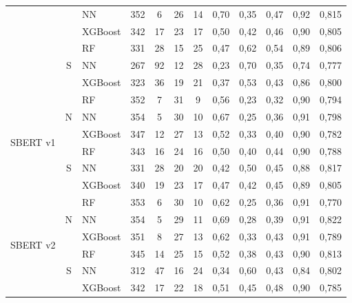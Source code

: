 \documentclass[conference]{IEEEtran}
\begin{document}
\begin{table}[t]
\begin{tabular}{lclccccccccc}
                                   &                    & NN      & 352 & 6  & 26 & 14 & 0,70& 0,35 & 0,47  & 0,92    & 0,815    \\ \cline{3-12} 
                                   &                    & XGBoost & 342 & 17 & 23 & 17 & 0,50& 0,42 & 0,46  & 0,90& 0,805    \\ \cline{2-12} 
                                   & \multirow{3}{*}{S} & RF      & 331 & 28 & 15 & 25 & 0,47 & 0,62 & 0,54  & 0,89    & 0,806    \\ \cline{3-12} 
                                   &                    & NN      & 267 & 92 & 12 & 28 & 0,23 & 0,70& 0,35  & 0,74    & 0,777    \\ \cline{3-12} 
                                   &                    & XGBoost & 323 & 36 & 19 & 21 & 0,37 & 0,53 & 0,43  & 0,86    & 0,800\\ \hline
\multirow{6}{*}{SBERT v1}          & \multirow{3}{*}{N} & RF      & 352 & 7  & 31 & 9  & 0,56 & 0,23 & 0,32  & 0,90& 0,794    \\ \cline{3-12} 
                                   &                    & NN      & 354 & 5  & 30 & 10 & 0,67 & 0,25 & 0,36  & 0,91    & 0,798    \\ \cline{3-12} 
                                   &                    & XGBoost & 347 & 12 & 27 & 13 & 0,52 & 0,33 & 0,40& 0,90& 0,782    \\ \cline{2-12} 
                                   & \multirow{3}{*}{S} & RF      & 343 & 16 & 24 & 16 & 0,50& 0,40& 0,44  & 0,90& 0,788    \\ \cline{3-12} 
                                   &                    & NN      & 331 & 28 & 20 & 20 & 0,42 & 0,50& 0,45  & 0,88    & 0,817    \\ \cline{3-12} 
                                   &                    & XGBoost & 340 & 19 & 23 & 17 & 0,47 & 0,42 & 0,45  & 0,89    & 0,805    \\ \hline
\multirow{6}{*}{SBERT v2}          & \multirow{3}{*}{N} & RF      & 353 & 6  & 30 & 10 & 0,62 & 0,25 & 0,36  & 0,91    & 0,770\\ \cline{3-12} 
                                   &                    & NN      & 354 & 5  & 29 & 11 & 0,69 & 0,28 & 0,39  & 0,91    & 0,822    \\ \cline{3-12} 
                                   &                    & XGBoost & 351 & 8  & 27 & 13 & 0,62 & 0,33 & 0,43  & 0,91    & 0,789    \\ \cline{2-12} 
                                   & \multirow{3}{*}{S} & RF      & 345 & 14 & 25 & 15 & 0,52 & 0,38 & 0,43  & 0,90& 0,813    \\ \cline{3-12} 
                                   &                    & NN      & 312 & 47 & 16 & 24 & 0,34 & 0,60& 0,43  & 0,84    & 0,802    \\ \cline{3-12} 
                                   &                    & XGBoost & 342 & 17 & 22 & 18 & 0,51 & 0,45 & 0,48  & 0,90& 0,785    \\ \hline
\end{tabular}
\end{table}
\end{document}
